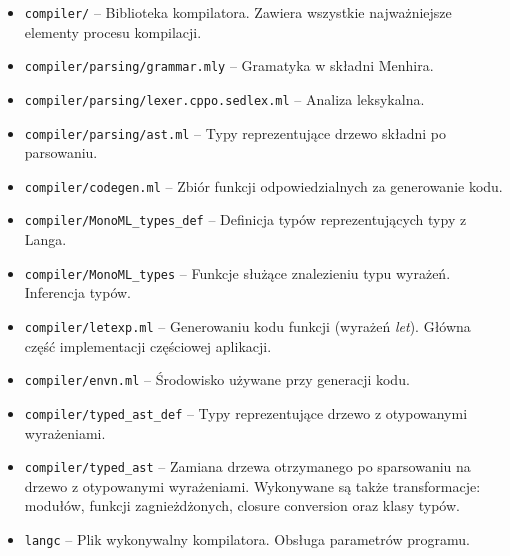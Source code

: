 \documentclass[declaration,shortabstract]{iithesis}
\begin{document}
\begin{itemize}
  \item \texttt{compiler/} -- Biblioteka kompilatora. Zawiera wszystkie 
  najważniejsze elementy procesu kompilacji.
  \item \texttt{compiler/parsing/grammar.mly} -- Gramatyka w składni Menhira.
  \item \texttt{compiler/parsing/lexer.cppo.sedlex.ml} -- Analiza leksykalna.
  \item \texttt{compiler/parsing/ast.ml} -- Typy reprezentujące drzewo składni 
  po parsowaniu.
  \item \texttt{compiler/codegen.ml} -- Zbiór funkcji odpowiedzialnych za 
  generowanie kodu.
  \item \texttt{compiler/MonoML\_types\_def} -- Definicja typów reprezentujących 
  typy z Langa.
  \item \texttt{compiler/MonoML\_types} -- Funkcje służące znalezieniu
  typu wyrażeń. Inferencja typów.
  \item \texttt{compiler/letexp.ml} -- Generowaniu kodu funkcji 
  (wyrażeń \textit{let}). 
  Główna część implementacji częściowej aplikacji.
  \item \texttt{compiler/envn.ml} -- Środowisko używane przy 
  generacji kodu.
  \item \texttt{compiler/typed\_ast\_def} -- Typy reprezentujące drzewo 
  z otypowanymi wyrażeniami.
  \item \texttt{compiler/typed\_ast} -- Zamiana drzewa otrzymanego po 
  sparsowaniu na \newline drzewo z otypowanymi wyrażeniami. Wykonywane są także 
  transformacje: modułów, funkcji zagnieżdżonych, closure conversion
  oraz klasy typów.
  \item \texttt{langc} -- Plik wykonywalny kompilatora. Obsługa 
  parametrów programu.

\end{itemize}




 

\end{document}
